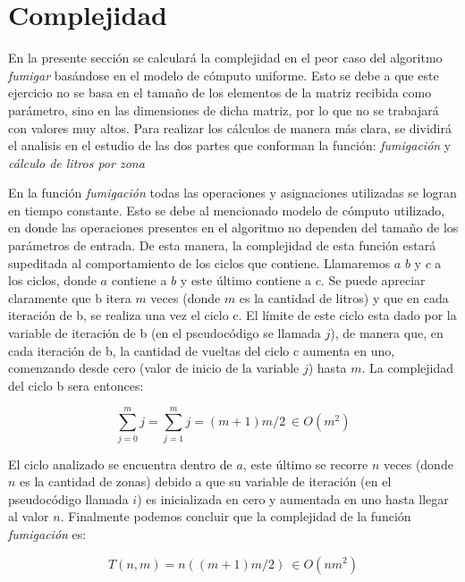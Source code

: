 \documentclass[a4paper,11pt] {article}
\begin{document}
\section*{Complejidad}

En la presente secci\'on se calcular\'a la complejidad en el peor caso del algoritmo \textit{fumigar} bas\'andose en el modelo de c\'omputo uniforme. Esto se debe a que este ejercicio no se basa en el tama\~{n}o de los elementos de la matriz recibida como par\'ametro, sino en las dimensiones de dicha matriz, por lo que no se trabajar\'a con valores muy altos. Para realizar los c\'alculos de manera m\'as clara, se dividir\'a el analisis en el estudio de las dos partes que conforman la funci\'on: \textit{fumigaci\'on} y \textit{c\'alculo de litros por zona}

En la funci\'on \textit{fumigaci\'on} todas las operaciones y asignaciones utilizadas se logran en tiempo constante. Esto se debe al mencionado modelo de c\'omputo utilizado, en donde las operaciones presentes en el algoritmo no dependen del tama\~{n}o de los par\'ametros de entrada. De esta manera, la complejidad de esta funci\'on estar\'a supeditada al comportamiento de los ciclos que contiene. Llamaremos $a$ $b$ y $c$ a los ciclos, donde $a$ contiene a $b$ y este \'ultimo contiene a $c$. Se puede apreciar claramente que b itera $m$ veces (donde $m$ es la cantidad de litros) y que en cada iteraci\'on de b, se realiza una vez el ciclo c. El l\'imite de este ciclo esta dado por la variable de iteraci\'on de b (en el pseudoc\'odigo se llamada $j$), de manera que, en cada iteraci\'on de b, la cantidad de vueltas del ciclo c aumenta en uno, comenzando desde cero (valor de inicio de la variable $j$) hasta $m$. La complejidad del ciclo b sera entonces:

$$\sum_{j=0}^{m}j=\sum_{j=1}^{m}j=(m+1)m/2\ \in O(m^{2})  $$

El ciclo analizado se encuentra dentro de $a$, este \'ultimo se recorre $n$ veces (donde $n$ es la cantidad de zonas) debido a que su variable de iteraci\'on (en el pseudoc\'odigo llamada $i$) es inicializada en cero y aumentada en uno hasta llegar al valor $n$. Finalmente podemos concluir que la complejidad de la funci\'on \textit{fumigaci\'on} es:

$$T(n,m)=n((m+1)m/2)\ \in O(nm^{2})$$
\end{document}

